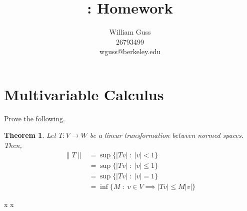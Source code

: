 \documentclass[letter]{article}
\title{\bCLASS: Homework \bHWN}
\author{William Guss\\26793499\\wguss@berkeley.edu}
\newtheorem{theorem}{Theorem}
\newenvironment{menumerate}{%
  \edef\backupindent{\the\parindent}%
  \enumerate%
  \setlength{\parindent}{\backupindent}%
}{\endenumerate}
\begin{document}
\maketitle
\thispagestyle{empty}


\setcounter{section}{4}
\section{Multivariable Calculus}
\begin{menumerate}
	\setcounter{enumi}{2}
	\item %
	Prove the following.
	\begin{theorem}
		Let $T: V\to W$ be a linear transformation between normed spaces. Then, 
		\begin{equation}
			\begin{aligned}
				\|T\| &= \sup \{|Tv|\;:\;|v| < 1 \} \\
				 &= \sup \{|Tv|\;:\;|v| \leq 1 \} \\
				 &= \sup \{|Tv|\;:\;|v| = 1 \} \\
				 &= \inf \{M\;:\;v \in V \implies |Tv| \leq M|v| \}
			\end{aligned}
		\end{equation}
	\end{theorem}x	  	 x	

	\setcounter{enumi}{3}
	\item %

	\setcounter{enumi}{5}
	\item %

	\setcounter{enumi}{11}
	\item %

	\item %
\end{menumerate}
\end{document}
